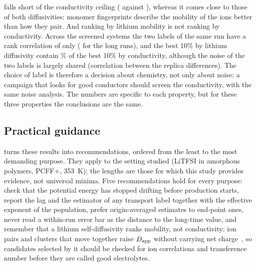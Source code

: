 \documentclass[journal=jcisd8,manuscript=article,email=true]{achemso}
\begin{document}
falls short of the conductivity ceiling (\genCondMl{} against \genCondCeil), whereas it comes close to
those of both diffusivities: monomer fingerprints describe the mobility of the ions better than
how they pair. And ranking by lithium mobility is not ranking by conductivity. Across the
screened systems the two labels of the same run have a rank correlation of only
\genCondVsLiRhoShort{} (\genCondVsLiRhoLong{} for the long runs), and the best 10\% by lithium
diffusivity contain \genCondVsLiTopTenPct\% of the best 10\% by conductivity, although the noise of
the two labels is largely shared (correlation \genCondVsLiNoiseCorr{} between the replica
differences). The choice of label is therefore a decision about chemistry, not only about noise:
a campaign that looks for good conductors should screen the conductivity, with the same noise
analysis. The numbers are specific to each property, but for these three properties the
conclusions are the same.

\begin{table}[ht]
\centering
\caption{Main results for the lithium and the TFSI anion diffusivities, both with the
origin-averaged estimator at half the run length, and for the cluster Nernst--Einstein
conductivity distributed by the platform. Noise statistics from the \nRep{} replicated
systems; random forest and allocation as in the previous sections (allocation with constant
noise).}\label{tab:general}
\resizebox{\textwidth}{!}{}
\end{table}

\subsection{Practical guidance}\label{sec:res-guide}
 turns these results into recommendations, ordered from the least to the most
demanding purpose. They apply to the setting studied (LiTFSI in amorphous polymers, PCFF+,
\SI{353}{\kelvin}); the lengths are those for which this study provides evidence, not universal
minima. Five recommendations hold for every purpose: check that the potential energy has stopped
drifting before production starts, report the lag and the estimator of any
transport label together with the effective exponent of the population, prefer origin-averaged
estimates to end-point ones, never read a within-run error bar as the distance to the long-time
value, and remember that a lithium self-diffusivity ranks mobility, not conductivity: ion pairs
and clusters that move together raise $D_{\mathrm{app}}$ without carrying net
charge~\cite{FranceLanord2019NernstEinstein}, so candidates selected by it should be checked for
ion correlations and transference number before they are called good electrolytes.
\end{document}
